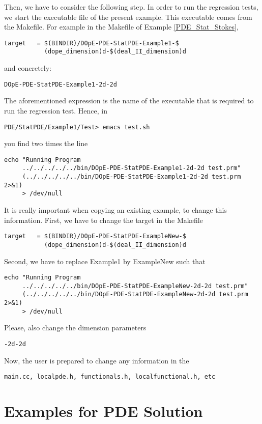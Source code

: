 \documentclass[a4paper,cleardoubleempty]{scrreprt}
\begin{document}
Then, we have to consider the following step. In order to 
run the regression tests, we start the executable file
of the present example. This executable comes from the 
Makefile. For example in the Makefile of 
Example \ref{PDE_Stat_Stokes}, 
\begin{verbatim}
target   = $(BINDIR)/DOpE-PDE-StatPDE-Example1-$
           (dope_dimension)d-$(deal_II_dimension)d
\end{verbatim}
and concretely:
\begin{verbatim}
DOpE-PDE-StatPDE-Example1-2d-2d
\end{verbatim}
The aforementioned expression is the name of 
the executable that is required to run the 
regression test. Hence, in 
\begin{verbatim}
PDE/StatPDE/Example1/Test> emacs test.sh
\end{verbatim}
you find two times the line
\begin{verbatim}
echo "Running Program 
     ../../../../../bin/DOpE-PDE-StatPDE-Example1-2d-2d test.prm"
     (../../../../../bin/DOpE-PDE-StatPDE-Example1-2d-2d test.prm 2>&1) 
     > /dev/null
\end{verbatim} 
It is really important when copying an existing example,
to change this information. 
First, we have to change the target in the Makefile
\begin{verbatim}
target   = $(BINDIR)/DOpE-PDE-StatPDE-ExampleNew-$
           (dope_dimension)d-$(deal_II_dimension)d
\end{verbatim}
Second, we have to replace 
Example1 by ExampleNew such that 
\begin{verbatim}
echo "Running Program 
     ../../../../../bin/DOpE-PDE-StatPDE-ExampleNew-2d-2d test.prm"
     (../../../../../bin/DOpE-PDE-StatPDE-ExampleNew-2d-2d test.prm 2>&1) 
     > /dev/null
\end{verbatim} 
Please, also change the dimension parameters 
\begin{verbatim}
-2d-2d
\end{verbatim} 
Now, the user is prepared to change any information in the 
\begin{verbatim}
main.cc, localpde.h, functionals.h, localfunctional.h, etc
\end{verbatim} 



\chapter{Examples for PDE Solution}
\label{PDE}
\end{document}
